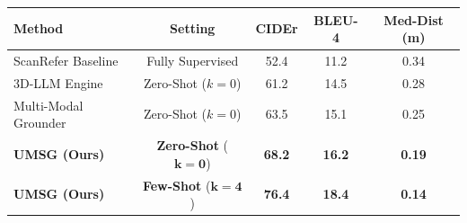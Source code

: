 \begin{tabular*}{\linewidth}{l@{\extracolsep{\fill}}cccc}
\toprule
\textbf{Method} & \textbf{Setting} & \textbf{CIDEr} & \textbf{BLEU-4} & \textbf{Med-Dist (m)} \\
\midrule
ScanRefer Baseline     & Fully Supervised  & 52.4 & 11.2 & 0.34 \\
3D-LLM Engine          & Zero-Shot ($k=0$) & 61.2 & 14.5 & 0.28 \\
Multi-Modal Grounder   & Zero-Shot ($k=0$) & 63.5 & 15.1 & 0.25 \\
\midrule
\textbf{UMSG (Ours)}   & \textbf{Zero-Shot} ($\mathbf{k=0}$) & \textbf{68.2} & \textbf{16.2} & \textbf{0.19} \\
\textbf{UMSG (Ours)}   & \textbf{Few-Shot} ($\mathbf{k=4}$)  & \textbf{76.4} & \textbf{18.4} & \textbf{0.14} \\
\bottomrule
\end{tabular*}
